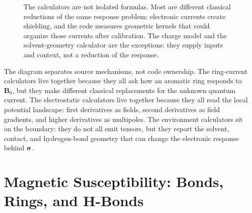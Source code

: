 \documentclass[11pt]{article}
\begin{document}
\begin{figure}[ht]
{}
\caption{The calculators are not isolated formulas. Most are different
classical reductions of the same response problem: electronic currents create
shielding, and the code measures geometric kernels that could organize those
currents after calibration. The charge model and the solvent-geometry
calculator are the exceptions: they supply inputs and context, not a reduction
of the response.}
\end{figure}

The diagram separates source mechanisms, not code ownership. The ring-current
calculators live together because they all ask how an aromatic ring responds to
\(\bm B_0\), but they make different classical replacements for the unknown
quantum current. The electrostatic calculators live together because they all
read the local potential landscape: first derivatives as fields, second
derivatives as field gradients, and higher derivatives as multipoles. The
environment calculators sit on the boundary: they do not all emit tensors, but
they report the solvent, contact, and hydrogen-bond geometry that can change the
electronic response behind \(\bm\sigma\).

\section{Magnetic Susceptibility: Bonds, Rings, and H-Bonds}
\end{document}
